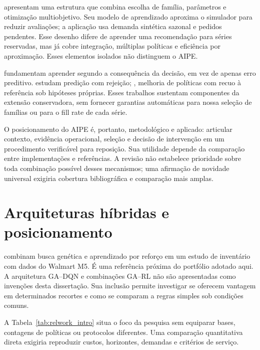 \citet{FrancuzBanyai2026Selection} apresentam uma estrutura que combina escolha de família, parâmetros e otimização multiobjetivo. Seu modelo de aprendizado aproxima o simulador para reduzir avaliações; a aplicação usa demanda sintética sazonal e pedidos pendentes. Esse desenho difere de aprender uma recomendação para séries reservadas, mas já cobre integração, múltiplas políticas e eficiência por aproximação. Esses elementos isolados não distinguem o AIPE.

\citet{ElmachtoubGrigas2022SPO} fundamentam aprender segundo a consequência da decisão, em vez de apenas erro preditivo. \citet{GeifmanElYaniv2019SelectiveNet} estudam predição com rejeição; \citet{Laroche2019SPIBB}, melhoria de políticas com recuo à referência sob hipóteses próprias. Esses trabalhos sustentam componentes da extensão conservadora, sem fornecer garantias automáticas para nossa seleção de famílias ou para o fill rate de cada série.

O posicionamento do AIPE é, portanto, metodológico e aplicado: articular contexto, evidência operacional, seleção e decisão de intervenção em um procedimento verificável para reposição. Sua utilidade depende da comparação entre implementações e referências. A revisão não estabelece prioridade sobre toda combinação possível desses mecanismos; uma afirmação de novidade universal exigiria cobertura bibliográfica e comparação mais amplas.

\section{Arquiteturas híbridas e posicionamento}

\citet{Zabraoui2025GaDQN} combinam busca genética e aprendizado por reforço em um estudo de inventário com dados do Walmart M5. É uma referência próxima do portfólio adotado aqui. A arquitetura GA--DQN e combinações GA--RL não são apresentadas como invenções desta dissertação. Sua inclusão permite investigar se oferecem vantagem em determinados recortes e como se comparam a regras simples sob condições comuns.

A Tabela~\ref{tab:relwork_intro} situa o foco da pesquisa sem equiparar bases, contagens de políticas ou protocolos diferentes. Uma comparação quantitativa direta exigiria reproduzir custos, horizontes, demandas e critérios de serviço.

